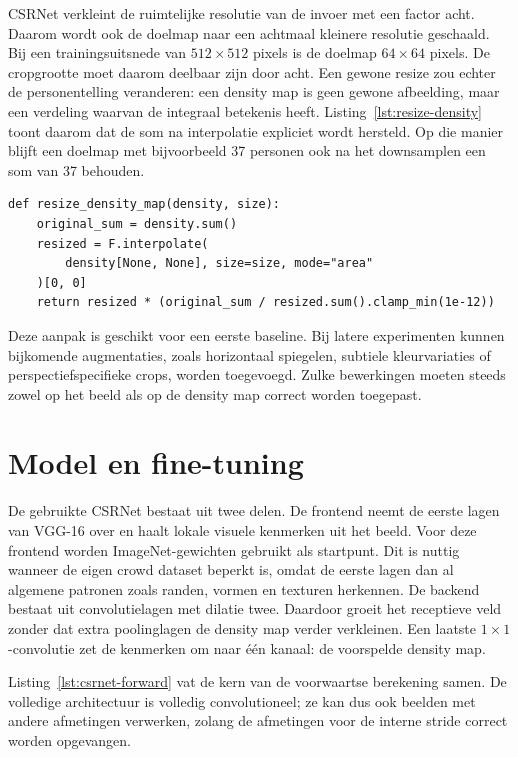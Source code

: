 CSRNet verkleint de ruimtelijke resolutie van de invoer met een factor acht. Daarom wordt ook de doelmap naar een achtmaal kleinere resolutie geschaald. Bij een trainingsuitsnede van \(512 \times 512\) pixels is de doelmap \(64 \times 64\) pixels. De cropgrootte moet daarom deelbaar zijn door acht. Een gewone resize zou echter de personentelling veranderen: een density map is geen gewone afbeelding, maar een verdeling waarvan de integraal betekenis heeft. Listing~\ref{lst:resize-density} toont daarom dat de som na interpolatie expliciet wordt hersteld. Op die manier blijft een doelmap met bijvoorbeeld 37 personen ook na het downsamplen een som van 37 behouden.

\begin{listing}[htbp]
\begin{verbatim}
def resize_density_map(density, size):
    original_sum = density.sum()
    resized = F.interpolate(
        density[None, None], size=size, mode="area"
    )[0, 0]
    return resized * (original_sum / resized.sum().clamp_min(1e-12))
\end{verbatim}
\caption{Density map schalen met behoud van de totale telling.}
\label{lst:resize-density}
\end{listing}

Deze aanpak is geschikt voor een eerste baseline. Bij latere experimenten kunnen bijkomende augmentaties, zoals horizontaal spiegelen, subtiele kleurvariaties of perspectiefspecifieke crops, worden toegevoegd. Zulke bewerkingen moeten steeds zowel op het beeld als op de density map correct worden toegepast.

\section{Model en fine-tuning}

De gebruikte CSRNet bestaat uit twee delen. De frontend neemt de eerste lagen van VGG-16 over en haalt lokale visuele kenmerken uit het beeld. Voor deze frontend worden ImageNet-gewichten gebruikt als startpunt. Dit is nuttig wanneer de eigen crowd dataset beperkt is, omdat de eerste lagen dan al algemene patronen zoals randen, vormen en texturen herkennen. De backend bestaat uit convolutielagen met dilatie twee. Daardoor groeit het receptieve veld zonder dat extra poolinglagen de density map verder verkleinen. Een laatste \(1 \times 1\)-convolutie zet de kenmerken om naar één kanaal: de voorspelde density map.

Listing~\ref{lst:csrnet-forward} vat de kern van de voorwaartse berekening samen. De volledige architectuur is volledig convolutioneel; ze kan dus ook beelden met andere afmetingen verwerken, zolang de afmetingen voor de interne stride correct worden opgevangen.

